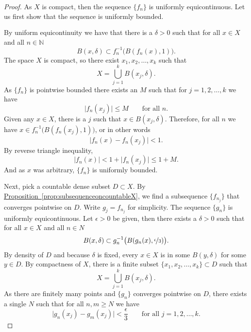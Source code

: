 \documentclass[12pt,openany]{book}
\newcommand{\sabs}[1]{\lvert {#1} \rvert}
\newcommand{\N}{{\mathbb{N}}}
\theoremstyle{plain}
\theoremstyle{remark}
\theoremstyle{definition}
\theoremstyle{exercise}
\theoremstyle{example}
\newcommand{\propref}[1]{\hyperref[#1]{Proposition~\ref*{#1}}}
\begin{document}
\begin{proof}
As $X$ is compact, then the sequence $\{ f_n \}$ is uniformly
equicontinuous.
Let us first show that the sequence is uniformly bounded.

By uniform equicontinuity we have that
there is a $\delta > 0$
such that
for all $x \in X$ and all $n \in \N$
\begin{equation*}
B(x,\delta) \subset f_n^{-1}\bigl(B(f_n(x),1)\bigr) .
\end{equation*}
The space $X$ is compact, so there exist $x_1,x_2,\ldots,x_k$
such that
\begin{equation*}
X = \bigcup_{j=1}^k B(x_j,\delta) .
\end{equation*}
As $\{ f_n \}$ is pointwise bounded there exists an $M$
such that for $j=1,2,\ldots,k$ we have
\begin{equation*}
\sabs{f_n(x_j)} \leq M \qquad \text{for all } n.
\end{equation*}
Given any
$x \in X$, there is a $j$ such that $x \in B(x_j,\delta)$.  Therefore,
for all $n$ we have
$x \in f_n^{-1}\bigl(B(f_n(x_j),1)\bigr)$, or in other words
\begin{equation*}
\sabs{f_n(x)-f_n(x_j)} < 1 .
\end{equation*}
By reverse triangle inequality,
\begin{equation*}
\sabs{f_n(x)} < 1+ \sabs{f_n(x_j)} \leq 1+M .
\end{equation*}
And as $x$ was arbitrary, $\{f_n\}$ is uniformly bounded.


Next, pick a countable dense subset $D \subset X$.
By \propref{prop:subsequenceoncountableX}, we find
a subsequence $\{ f_{n_j} \}$ that converges pointwise on $D$.
Write $g_j = f_{n_j}$ for simplicity.
The sequence $\{ g_n \}$ is 
uniformly equicontinuous.
Let $\epsilon > 0$ be given, then there exists a $\delta > 0$
such that for all $x \in X$ and all $n \in N$
\begin{equation*}
B(x,\delta) \subset g_n^{-1}\bigl(B(g_n(x),\nicefrac{\epsilon}{3})\bigr).
\end{equation*}
By density of $D$ and because $\delta$ is fixed, every $x \in X$ is in some $B(y,\delta)$
for some $y \in D$.  By compactness of $X$,
there is a finite subset $\{ x_1,x_2,\ldots,x_k \} \subset D$
such that
\begin{equation*}
X = \bigcup_{j=1}^k B(x_j,\delta) .
\end{equation*}
As there are finitely many points and $\{ g_n \}$
converges pointwise on $D$, there exists a single $N$ such that for 
all $n,m \geq N$ we have
\begin{equation*}
\sabs{g_n(x_j)-g_m(x_j)} < \frac{\epsilon}{3}
 \qquad \text{for all } j=1,2,\ldots,k.
\end{equation*}


\end{proof}
\end{document}

